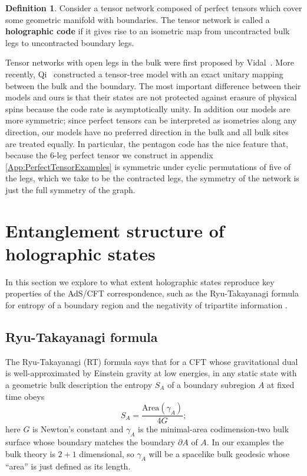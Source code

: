 \documentclass[12pt]{article}
\theoremstyle{plain}
\theoremstyle{plain}
\theoremstyle{plain}
\theoremstyle{plain}
\theoremstyle{result}
\theoremstyle{remark}
\theoremstyle{conjecture}
\theoremstyle{observation}
\theoremstyle{definition}
\theoremstyle{corollary}
\theoremstyle{definition}
\theoremstyle{definition}
\newtheorem{definition}{Definition}
\theoremstyle{assumption}
\theoremstyle{definition}
\theoremstyle{problem}
\theoremstyle{fact}
\newcommand{\be}{\begin{equation}}
\newcommand{\ee}{\end{equation}}
\begin{document}
\begin{definition}
Consider a tensor network composed of perfect tensors which cover some geometric manifold with boundaries. The tensor network is called a \textbf{holographic code} if it gives rise to an isometric map from uncontracted bulk legs to uncontracted boundary legs.
\end{definition}

Tensor networks with open legs in the bulk were first proposed by Vidal~\cite{Vidal08}. 
More recently, Qi~\cite{Qi13} constructed a tensor-tree model with an exact unitary mapping between the bulk and the boundary. 
The most important difference between their models and ours is that their states are not protected against erasure of physical spins because the code rate is asymptotically unity. 
In addition our models are more symmetric; since perfect tensors can be interpreted as isometries along any direction, our models have no preferred direction in the bulk and all bulk sites are treated equally.
In particular, the pentagon code has the nice feature that, because the 6-leg perfect tensor we construct in appendix \ref{App:PerfectTensorExamples} is symmetric under cyclic permutations of five of the legs, which we take to be the contracted legs, the symmetry of the network is just the full symmetry of the graph.

\section{Entanglement structure of holographic states}\label{sec:state}
In this section we explore to what extent holographic states reproduce key properties of the AdS/CFT correspondence, such as the Ryu-Takayanagi formula for entropy of a boundary region \cite{Ryu06} and the negativity of tripartite information \cite{Hayden13b}.  

\subsection{Ryu-Takayanagi formula}
The Ryu-Takayanagi (RT) formula says that for a CFT whose gravitational dual is well-approximated by Einstein gravity at low energies, in any static state with a geometric bulk description the entropy $S_A$ of a boundary subregion $A$ at fixed time obeys
\be
S_A=\frac{\mathrm{Area}(\gamma_A)}{4G};
\ee
here $G$ is Newton's constant and $\gamma_A$ is the minimal-area codimension-two bulk surface whose boundary matches the boundary $\partial A$ of $A$.  
In our examples the bulk theory is $2+1$ dimensional, so $\gamma_A$ will be a spacelike bulk geodesic whose ``area'' is just defined as its length.  
\end{document}

